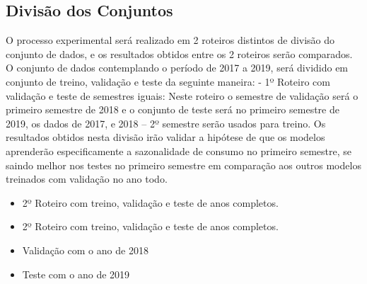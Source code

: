 \documentclass[	12pt, Times, openright, twoside, a4paper, english, brazil]{abntex2}
\begin{document}
        
	
    	\subsection{Divisão dos Conjuntos}
            O processo experimental será realizado em 2 roteiros distintos de divisão do conjunto de dados, e os resultados obtidos entre os 2 roteiros serão comparados.
            O conjunto de dados contemplando o período de 2017 a 2019, será dividido em conjunto de treino, validação e teste da seguinte maneira: 
            - 1º Roteiro com validação e teste de semestres iguais: 
            Neste roteiro o semestre de validação será o primeiro semestre de 2018 e o conjunto de teste será no primeiro semestre de 2019, os dados de 2017, e 2018 – 2º semestre serão usados para treino. Os resultados obtidos nesta divisão irão validar a hipótese de que os modelos aprenderão especificamente a sazonalidade de consumo no primeiro semestre, se saindo melhor nos testes no primeiro semestre em comparação aos outros modelos treinados com validação no ano todo.
            \begin{itemize}
                    \item 2º Roteiro com treino, validação e teste de anos completos.
                    \item 2º Roteiro com treino, validação e teste de anos completos.
                    \item Validação com o ano de 2018
                    \item Teste com o ano de 2019             
            \end{itemize}
    
\end{document}
